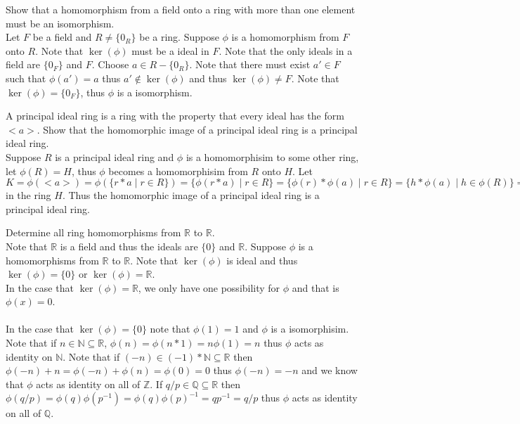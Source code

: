 \documentclass[12pt]{article}
\makeatletter
\theoremstyle{homework}
\newenvironment{exercise}[1]
{\def\@currentlabel{#1}\exercisecore}
{\endexercisecore}
\makeatother
\begin{document}
\begin{exercise}{15.46}
Show that a homomorphism from a field onto a ring with more than one element must be an isomorphism.\\
Let $F$ be a field and $R\neq \{0_R\}$ be a ring.  Suppose $\phi$ is a homomorphism from $F$ onto $R$.  Note that $\ker(\phi)$ must be a ideal in $F$.  Note that the only ideals in a field are $\{0_F\}$ and $F$.  Choose $a\in R-\{0_R\}$.  Note that there must exist $a'\in F$ such that $\phi(a')=a$ thus $a'\not\in\ker(\phi)$ and thus $\ker(\phi)\neq F$.  Note that $\ker(\phi)=\{0_F\}$, thus $\phi$ is a isomorphism.
\end{exercise}

\begin{exercise}{15.48}
A principal ideal ring is a ring with the property that every ideal has the form $<a>$.  Show that the homomorphic image of a principal ideal ring is a principal ideal ring.\\
Suppose $R$ is a principal ideal ring and $\phi$ is a homomorphisim to some other ring, let $\phi(R)=H$, thus $\phi$ becomes a homomorphisim from $R$ onto $H$.  Let $K=\phi(<a>)=\phi(\{r*a\mid r\in R\})=\{\phi(r*a)\mid r\in R\}=\{\phi(r)*\phi(a)\mid r\in R\}=\{h*\phi(a)\mid h\in \phi(R)\}=\{h*\phi(a)\mid h\in H\}=<\phi(a)>$ in the ring $H$.  Thus the homomorphic image of a principal ideal ring is a principal ideal ring.
\end{exercise}

\begin{exercise}{15.53}
Determine all ring homomorphisms from $\mathbb{R}$ to $\mathbb{R}$.\\
Note that $\mathbb{R}$ is a field and thus the ideals are $\{0\}$ and $\mathbb{R}$.  Suppose $\phi$ is a homomorphisms from $\mathbb{R}$ to $\mathbb{R}$.  Note that $\ker(\phi)$ is ideal and thus $\ker(\phi)=\{0\}$ or $\ker(\phi)=\mathbb{R}$.\\
In the case that $\ker(\phi)=\mathbb{R}$, we only have one possibility for $\phi$ and that is $\phi(x)=0$.\\\\
In the case that $\ker(\phi)=\{0\}$ note that $\phi(1)=1$ and $\phi$ is a isomorphisim.  Note that if $n\in\mathbb{N}\subseteq \mathbb{R}$, $\phi(n)=\phi(n*1)=n\phi(1)=n$ thus $\phi$ acts as identity on $\mathbb{N}$.  Note that if $(-n)\in(-1)*\mathbb{N}\subseteq \mathbb{R}$ then $\phi(-n)+n=\phi(-n)+\phi(n)=\phi(0)=0$ thus $\phi(-n)=-n$ and we know that $\phi$ acts as identity on all of $\mathbb{Z}$.  If $q/p\in\mathbb{Q}\subseteq\mathbb{R}$ then $\phi(q/p)=\phi(q)\phi(p^{-1})=\phi(q)\phi(p)^{-1}=qp^{-1}=q/p$ thus $\phi$ acts as identity on all of $\mathbb{Q}$.
\end{exercise}

\begin{exercise}{15.56}

\end{exercise}
\end{document}
